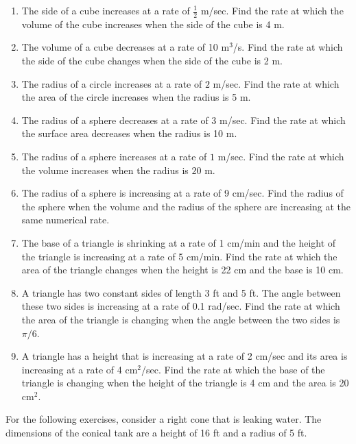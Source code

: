 \documentclass{exercises}
\begin{document}
\begin{enumerate}[resume]
\item The side of a cube increases at a rate of $\frac{1}{2}$ m/sec. Find the rate at which the volume of the cube increases when the side of the cube is 4 m.
\item The volume of a cube decreases at a rate of 10 m$^{3}$/s. Find the rate at which the side of the cube changes when the side of the cube is 2 m.
\item The radius of a circle increases at a rate of $2$ m/sec. Find the rate at which the area of the circle increases when the radius is 5 m.
\item The radius of a sphere decreases at a rate of $3$ m/sec. Find the rate at which the surface area decreases when the radius is 10 m.
\item The radius of a sphere increases at a rate of $1$ m/sec. Find the rate at which the volume increases when the radius is $20$ m.
\item The radius of a sphere is increasing at a rate of 9 cm/sec. Find the radius of the sphere when the volume and the radius of the sphere are increasing at the same numerical rate.
\item The base of a triangle is shrinking at a rate of 1 cm/min and the height of the triangle is increasing at a rate of 5 cm/min. Find the rate at which the area of the triangle changes when the height is 22 cm and the base is 10 cm.
\item A triangle has two constant sides of length 3 ft and 5 ft. The angle between these two sides is increasing at a rate of 0.1 rad/sec. Find the rate at which the area of the triangle is changing when the angle between the two sides is $\pi/6$.
\item A triangle has a height that is increasing at a rate of 2 cm/sec and its area is increasing at a rate of 4 cm$^{2}$/sec. Find the rate at which the base of the triangle is changing when the height of the triangle is 4 cm and the area is 20 cm$^{2}$.
\end{enumerate}

For the following exercises, consider a right cone that is leaking water. The dimensions of the conical tank are a height of 16 ft and a radius of 5 ft.
\end{document}
